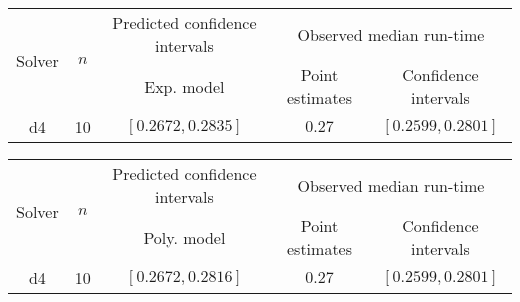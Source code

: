 \begin{tabular}{ccccc}
\hline 
\multirow{2}{*}{Solver} & \multirow{2}{*}{$n$} & Predicted confidence intervals & \multicolumn{2}{c}{Observed median  run-time}\tabularnewline
 &  & Exp. model  & Point estimates  & Confidence intervals\tabularnewline
\hline 
\hline 
\multirow{0}{*}{d4} & 10 & $\mathbf{\left[0.2672,0.2835\right]}$ & $0.27$ & $\left[0.2599,0.2801\right]$ \tabularnewline 
\hline 
\end{tabular} 

\begin{tabular}{ccccc}
\hline 
\multirow{2}{*}{Solver} & \multirow{2}{*}{$n$} & Predicted confidence intervals & \multicolumn{2}{c}{Observed median  run-time}\tabularnewline
 &  & Poly. model  & Point estimates  & Confidence intervals\tabularnewline
\hline 
\hline 
\multirow{0}{*}{d4} & 10 & $\mathbf{\left[0.2672,0.2816\right]}$ & $0.27$ & $\left[0.2599,0.2801\right]$ \tabularnewline 
\hline 
\end{tabular} 


